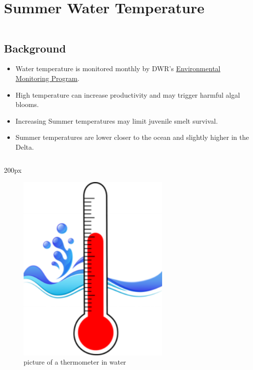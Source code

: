 \documentclass[
]{book}
\providecommand{\tightlist}{%
  \setlength{\itemsep}{0pt}\setlength{\parskip}{0pt}}
\begin{document}
\hypertarget{summer-water-temperature}{%
\section{Summer Water Temperature}\label{summer-water-temperature}}

\begin{column}{0.7\textwidth}
\hypertarget{background-7}{%
\subsection{Background}\label{background-7}}

\begin{itemize}
\tightlist
\item
  Water temperature is monitored monthly by DWR's \href{https://emp.baydeltalive.com/wiki/12297}{Environmental Monitoring Program}.
\item
  High temperature can increase productivity and may trigger harmful algal blooms.
\item
  Increasing Summer temperatures may limit juvenile smelt survival.
\item
  Summer temperatures are lower closer to the ocean and slightly higher in the Delta.
\end{itemize}
\end{column}

\begin{column}{200px\textwidth}
\begin{figure}

{\centering \includegraphics[width=2.94in]{figures/thermometer} 

}

\caption{picture of a thermometer in water}\label{fig:unnamed-chunk-55}
\end{figure}
\end{column}
\end{document}
